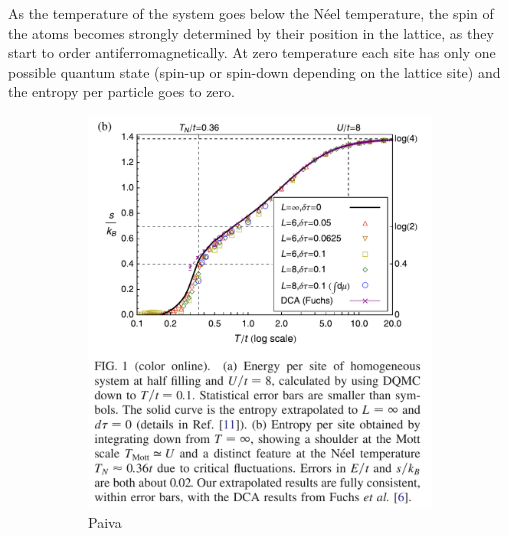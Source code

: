 \documentclass[11pt,letter]{article}
\begin{document}
As the temperature of the system goes below the N\'{e}el temperature, the spin
of the atoms becomes strongly determined by their position in the lattice,  as
they start to order antiferromagnetically.  At zero temperature each site has
only one possible quantum state (spin-up or spin-down depending on the lattice
site) and the entropy per particle goes to zero.   

\begin{figure}
        \centering
        \begin{subfigure}[b]{0.48\textwidth}
                \includegraphics[width=\textwidth]{figures/paiva_entropy.png}
                \caption{Paiva~\cite{Paiva2011}}
                \label{fig:paiva-entropy3D}
        \end{subfigure}
        ~ %
        \begin{subfigure}[b]{0.48\textwidth}

\end{subfigure}
\end{figure}
\end{document}
